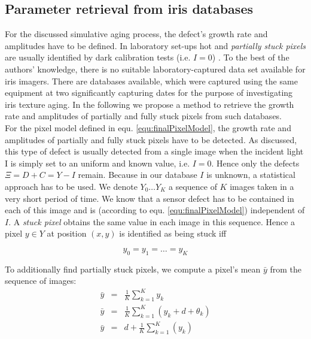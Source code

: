 \documentclass[10pt,twocolumn,letterpaper]{article}
\begin{document}
 \subsection{Parameter retrieval from iris databases}
 \label{hotPixelRate}
 For the discussed simulative aging process, the defect's growth rate and amplitudes have to be defined. In laboratory set-ups hot and \emph{partially stuck pixels} are usually identified by dark calibration tests (i.e. $I=0$) \cite{defectIdentification}. To the best of the authors' knowledge, there is no suitable laboratory-captured data set available for iris imagers. There are databases \cite{czajkaTemplateAging, agedIris} available, which were captured using the same equipment at two significantly capturing dates for the purpose of investigating iris texture aging. In the following we propose a method to retrieve the growth rate and amplitudes of partially and fully stuck pixels from such databases.\\

For the pixel model defined in equ. \ref{equ:finalPixelModel}, the growth rate and amplitudes of partially and fully stuck pixels have to be detected. As discussed, this type of defect is usually detected from a single image when the incident light I is simply set to an uniform and known value, i.e. $I=0$. Hence only the defects $\Xi = D+C = Y-I$ remain. Because in our database $I$ is unknown, a statistical approach has to be used.
We denote $Y_0 \dots Y_K$ a sequence of $K$ images taken in a very short period of time. We know that a sensor defect has to be contained in each of this image and is (according to equ. \ref{equ:finalPixelModel}) independent of $I$. A \emph{stuck pixel} obtains the same value in each image in this sequence. Hence a pixel $y \in Y$ at position $(x,y)$ is identified as being stuck iff

\begin{equation}
y_{0} = y_{1} = \dots = y_{K} \label{equ:conditionStuck}
\end{equation}

To additionally find partially stuck pixels, we compute a pixel's mean $\bar{y}$ from the sequence of images:
\begin{eqnarray}
\bar{y} & = & \frac{1}{K}\sum\limits_{k=1}^{K}y_k \\
\bar{y} & = & \frac{1}{K}\sum\limits_{k=1}^{K}(y_k+d+\theta_k) \label{equ:modelWithNoise} \\
\bar{y} & = & d+\frac{1}{K}\sum\limits_{k=1}^{K}(y_k) \label{equ:modelWithD}
\end{eqnarray}
\end{document}
